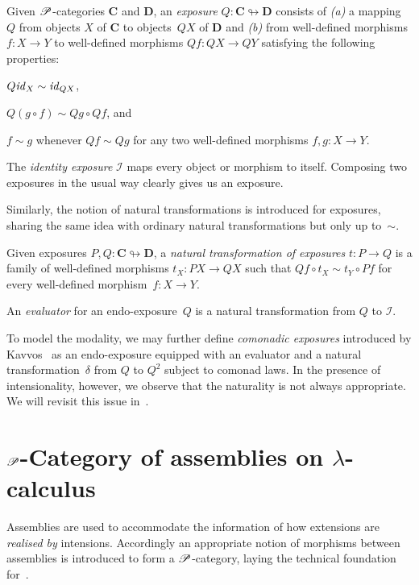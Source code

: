 \documentclass[a4paper,UKenglish,numberwithinsect,cleveref,thm-restate]{lipics-v2021}
\numberwithin{equation}{section}
\theoremstyle{definition}
\theoremstyle{plain}
\begin{document}
\begin{definition}
  Given $\mathscr{P}$-categories $\mathbf{C}$ and $\mathbf{D}$, an \emph{exposure} $Q\colon \mathbf{C} \looparrowright \mathbf{D}$ consists of \emph{(a)} a mapping $Q$ from objects $X$ of\/ $\mathbf{C}$ to objects~$QX$ of\/ $\mathbf{D}$ and \emph{(b)} from well-defined morphisms $f\colon X \to Y$ to well-defined morphisms $Qf\colon QX \to QY$ satisfying the following properties:
  \begin{romanenumerate}
    \item $Q\mathit{id}_X \sim \mathit{id}_{QX}$,
    \item $Q(g \circ f) \sim Qg \circ Qf$, and
    \item $f \sim g$ whenever $Qf \sim Qg$ for any two well-defined morphisms $f, g\colon X \to Y$. 
  \end{romanenumerate}
\end{definition}
The \emph{identity exposure} $\mathcal{I}$ maps every object or morphism to itself.
Composing two exposures in the usual way clearly gives us an exposure. 

Similarly, the notion of natural transformations is introduced for exposures, sharing the same idea with ordinary natural transformations but only up to~$\sim$.
\begin{definition}
  Given exposures $P, Q\colon \mathbf{C} \looparrowright \mathbf{D}$, a \emph{natural transformation of exposures} $t\colon P \to Q$ is a family of well-defined morphisms $t_X \colon PX \to QX$ such that $Qf \circ t_X \sim t_Y \circ Pf$ for every well-defined morphism~$f\colon X \to Y$. 
\end{definition}
An \emph{evaluator} for an endo-exposure~$Q$ is a natural transformation from $Q$ to $\mathcal{I}$.

To model the \SFour modality, we may further define \emph{comonadic exposures} introduced by Kavvos~\cite{Kavvos2017b} as an endo-exposure equipped with an evaluator and a natural transformation~$\delta$ from $Q$ to $Q^2$ subject to comonad laws.
In the presence of intensionality, however, we observe that the naturality is not always appropriate.
We will revisit this issue in~.

\section{\texorpdfstring{$\mathscr{P}$}{P}-Category of assemblies on \texorpdfstring{$\lambda$}{λ}-calculus}\label{sec:assemblies}

Assemblies are used to accommodate the information of how extensions are \emph{realised by} intensions.
Accordingly an appropriate notion of morphisms between assemblies is introduced to form a $\mathscr{P}$-category, laying
the technical foundation for~.
\end{document}
